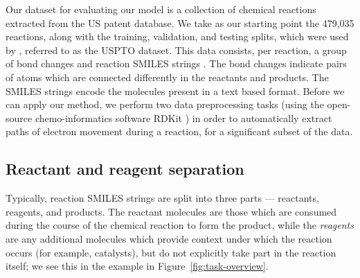 

Our dataset for evaluating our model is a collection of chemical reactions extracted from the US patent database\citep{lowe2012extraction,Lowe2017}.
We take as our starting point the 479,035 reactions, along with the training, validation, and testing splits, 
which were used by \citet{jin2017predicting}, referred to as the USPTO dataset.
This data consists, per reaction, a group of bond changes and reaction SMILES strings \citep{weininger1988smiles}.
The bond changes indicate pairs of atoms which are connected differently in the reactants and products.
The SMILES strings encode the molecules present in a text based format.
Before we can apply our method, we perform two data preprocessing tasks 
(using the open-source chemo-informatics software RDKit \citep{rdkit}) 
in order to automatically extract paths of electron movement during a reaction, 
for a significant subset of the data.

\subsection{Reactant and reagent separation}

Typically, reaction SMILES strings are split into three parts --- reactants, reagents, and products.
The reactant molecules are those which are consumed during the course of the chemical reaction to form the  product, 
while the {\em reagents} are any additional molecules which provide context under which the reaction occurs (for example, catalysts),
but do not explicitly take part in the reaction itself; we see this in the example in Figure~\ref{fig:task-overview}.

